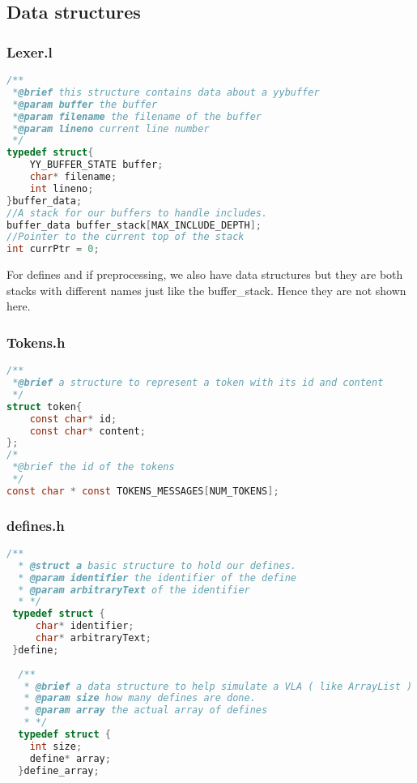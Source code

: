 \documentclass{article}
\begin{document}
\subsection{Data structures}
\subsubsection{Lexer.l}
\label{sec:lexerData}
\begin{lstlisting}[language=C]
 /**
 *@brief this structure contains data about a yybuffer
 *@param buffer the buffer
 *@param filename the filename of the buffer
 *@param lineno current line number
 */
typedef struct{
	YY_BUFFER_STATE buffer;
	char* filename;
	int lineno;
}buffer_data;
//A stack for our buffers to handle includes.
buffer_data buffer_stack[MAX_INCLUDE_DEPTH];
//Pointer to the current top of the stack 
int currPtr = 0;

\end{lstlisting}

For defines and if preprocessing, we also have data structures but they are both stacks with different names just like the buffer\_stack. Hence they are not shown here. 
\subsubsection{Tokens.h}
\begin{lstlisting}[language=C]
/**
 *@brief a structure to represent a token with its id and content
 */
struct token{
	const char* id;
	const char* content;
};
/*
 *@brief the id of the tokens
 */
const char * const TOKENS_MESSAGES[NUM_TOKENS];

\end{lstlisting}
\subsubsection{defines.h}
\label{sec:defineData}
\begin{lstlisting}[language=C]
 /**
  * @struct a basic structure to hold our defines. 
  * @param identifier the identifier of the define
  * @param arbitraryText of the identifier
  * */
 typedef struct {
	 char* identifier;
	 char* arbitraryText;
 }define;
 
  /**
   * @brief a data structure to help simulate a VLA ( like ArrayList ) 
   * @param size how many defines are done. 
   * @param array the actual array of defines
   * */
  typedef struct {
	int size;
	define* array;  
  }define_array;

  
\end{lstlisting}
\end{document}
